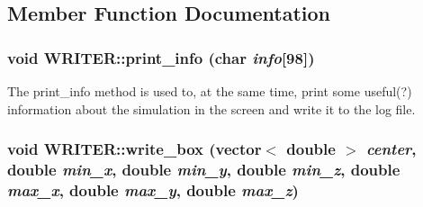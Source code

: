 \subsection{Member Function Documentation}
\hypertarget{classWRITER_a11c7d32eb43e430e5d27eb219465a076}{
\subsubsection[{print\_\-info}]{\setlength{\rightskip}{0pt plus 5cm}void WRITER::print\_\-info (char {\em info}\mbox{[}98\mbox{]})}}
\label{classWRITER_a11c7d32eb43e430e5d27eb219465a076}
The print\_\-info method is used to, at the same time, print some useful(?) information about the simulation in the screen and write it to the log file. \hypertarget{classWRITER_aa111d42a3e15462bc5f1e5d450220ac4}{
\subsubsection[{write\_\-box}]{\setlength{\rightskip}{0pt plus 5cm}void WRITER::write\_\-box (vector$<$ double $>$ {\em center}, \/  double {\em min\_\-x}, \/  double {\em min\_\-y}, \/  double {\em min\_\-z}, \/  double {\em max\_\-x}, \/  double {\em max\_\-y}, \/  double {\em max\_\-z})}}
\label{classWRITER_aa111d42a3e15462bc5f1e5d450220ac4}

